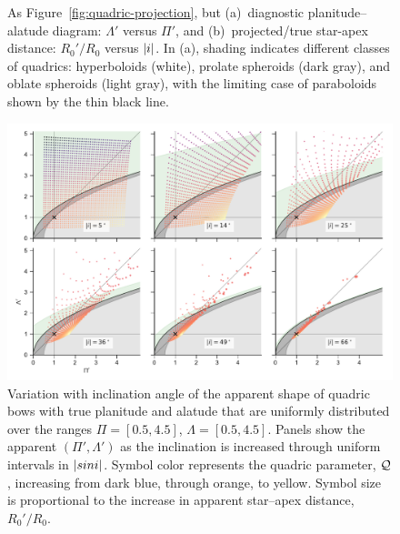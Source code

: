 \begin{figure}
\begin{tabular}{@{}ll@{}}
  \end{tabular}
  \caption[]{ As Figure~\ref{fig:quadric-projection}, but %
    (a)~diagnostic planitude--alatude diagram: \(\Lambda'\) versus
    \(\Pi'\), and %
    (b)~projected/true star-apex distance: \(R_0' / R_0\) versus
    \(\lvert i\rvert\). %
    In (a), shading indicates different classes of quadrics:
    hyperboloids (white), prolate spheroids (dark gray), and oblate
    spheroids (light gray), with the limiting case of paraboloids
    shown by the thin black line.}
  \label{fig:quadric-projection-continued}
\end{figure}

\begin{figure}
  \centering
  \includegraphics[width=\linewidth]{figs/projected-R90-Rc-snapshots}
  \caption{Variation with inclination angle of the apparent shape of
    quadric bows with true planitude and alatude that are uniformly
    distributed over the ranges \(\Pi = [0.5, 4.5]\),
    \(\Lambda = [0.5, 4.5]\).  Panels show the apparent
    \((\Pi', \Lambda')\) as the inclination is increased through uniform
    intervals in \(\lvert sin i\rvert\).  Symbol color represents the quadric
    parameter, \(\mathcal{Q}\), increasing from dark blue, through orange, to
    yellow. Symbol size is proportional to the increase in apparent
    star--apex distance, \(R_0'/R_0\).}
  \label{fig:projected-R90-Rc-snapshots}
\end{figure}

